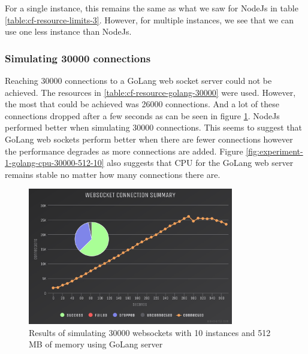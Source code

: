 For a single instance, this remains the same as what we saw for NodeJs in table \ref{table:cf-resource-limits-3}. However, for multiple instances, we see that we can use one less instance than NodeJs. 

\subsubsection{Simulating 30000 connections}

Reaching 30000 connections to a GoLang web socket server could not be achieved. The resources in \ref{table:cf-resource-golang-30000} were used. However, the most that could be achieved was 26000 connections. And a lot of these connections dropped after a few seconds as can be seen in figure \ref{fig:experiment-1-golang-conn-30000-512-10}. NodeJs performed better when simulating 30000 connections. This seems to suggest that GoLang web sockets perform better when there are fewer connections however the performance degrades as more connections are added. Figure \ref{fig:experiment-1-golang-cpu-30000-512-10} also suggests that CPU for the GoLang web server remains stable no matter how many connections there are.

\begin{table}[H]
\caption{Cloud Foundry Resource Limits}
\label{table:cf-resource-golang-30000}
\end{table}

\begin{figure}[H]
  \centering
    \includegraphics[width=0.8\textwidth]{figures/experiments/experiment-1/golang/conn-30000-512-10.png}
    \caption{Results of simulating 30000 websockets with 10 instances and 512 MB of memory using GoLang server}
    \label{fig:experiment-1-golang-conn-30000-512-10}
\end{figure}

